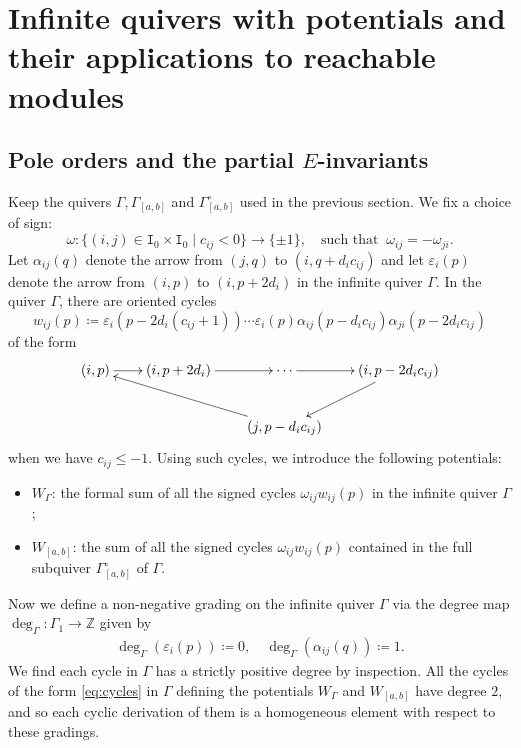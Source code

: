 \documentclass[12pt]{amsart}
\theoremstyle{definition}
\theoremstyle{remark}
\numberwithin{equation}{section}
\begin{document}
\section{Infinite quivers with potentials and their applications to reachable modules} \label{sec: application}
\subsection{Pole orders and the partial $E$-invariants}\label{sec:poE}



Keep the quivers $\Gamma, \Gamma_{[a,b]}$ and $\Gamma_{[a,b]}^\circ$ used in the previous section. We fix a choice of sign: $$\omega\colon\{(i,j)\in \mathtt I_0\times \mathtt I_0\mid c_{ij}<0\}\to \{\pm 1\},\quad \text{such that}\;\;\omega_{ij}=-\omega_{ji}.$$  Let $\alpha_{ij}(q)$ denote the arrow from $(j,q)$ to $(i,q+d_ic_{ij})$ and let $\varepsilon_i(p)$ denote the arrow from $(i,p)$ to $(i,p+2d_i)$ in the infinite quiver $\Gamma$. In the quiver $\Gamma$, there are oriented cycles
\[w_{ij}(p)\coloneqq\varepsilon_i(p-2d_i(c_{ij}+1))\cdots \varepsilon_i(p)\alpha_{ij}(p-d_i c_{ij})\alpha_{ji}(p-2d_i c_{ij})\] 
of the form
\begin{equation} \label{eq:cycles}
\vcenter{\xymatrix@C=2em{
(i,p) \ar[r] & (i,p+2d_i) \ar[r] & \cdots \ar[r] & (i,p-2d_ic_{ij}) \ar[dl]\\
& & (j,p-d_ic_{ij}) \ar[llu]& 
}}
\end{equation}
when we have $c_{ij}\leq -1$. 
Using such cycles, we introduce the following potentials:
\begin{itemize}
    \item $W_\Gamma$: the formal sum of all the signed cycles $\omega_{ij}w_{ij}(p)$ in the infinite quiver $\Gamma$;
    \item $W_{[a,b]}$: the sum of all the signed cycles $\omega_{ij}w_{ij}(p)$ contained in the full subquiver $\Gamma_{[a,b]}^\circ$ of $\Gamma$.
\end{itemize}
Now we define a non-negative grading on the infinite quiver $\Gamma$ via the degree map $\deg_{\Gamma}\colon \Gamma_1\to \mathbb Z$ given  by
    \begin{align}\label{eq:deggam}
\deg_{\Gamma}(\varepsilon_i(p))\coloneqq 0, \quad \deg_{\Gamma}(\alpha_{ij}(q))\coloneqq 1.
\end{align}
We find each cycle in $\Gamma$ has a strictly positive degree by inspection. 
 All the cycles of the form \eqref{eq:cycles} in $\Gamma$ defining the potentials $W_\Gamma$ and $W_{[a,b]}$ have degree $2$, and so each cyclic derivation of them is a homogeneous element with respect to these gradings. 
\end{document}

